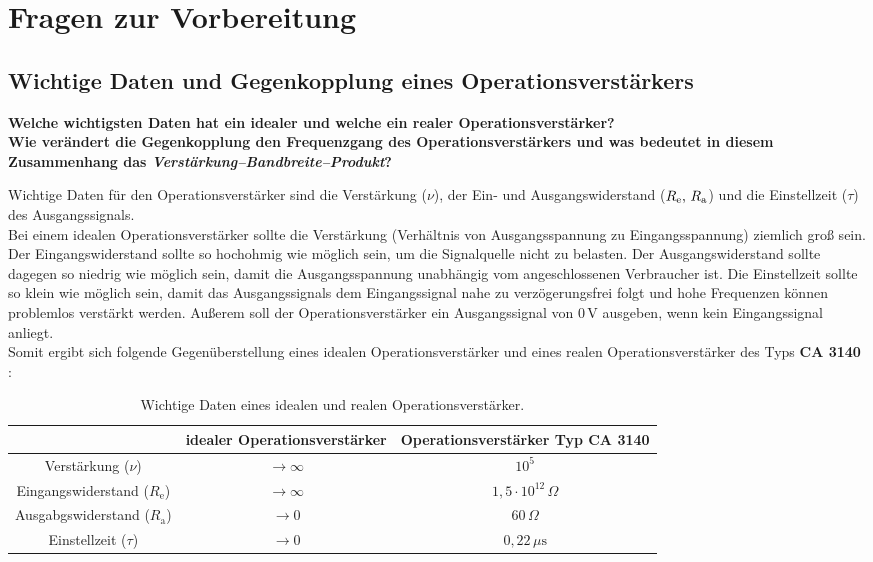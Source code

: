 \chapter{Fragen zur Vorbereitung}
\section{Wichtige Daten und Gegenkopplung eines Operationsverstärkers}
\textbf{Welche wichtigsten Daten hat ein idealer und welche ein realer Operationsverstärker?\\
Wie verändert die Gegenkopplung den Frequenzgang des Operationsverstärkers und
was bedeutet in diesem Zusammenhang das \textit{Verstärkung–Bandbreite–Produkt}?}

Wichtige Daten für den Operationsverstärker sind die Verstärkung ($\nu$), der Ein-\- und Ausgangswiderstand (\(R_\text{e}$, $R_\text{a}\)) und die Einstellzeit ($\tau$) des Ausgangssignals.\\
Bei einem idealen Operationsverstärker sollte die Verstärkung (Verhältnis von Ausgangsspannung zu Eingangsspannung) ziemlich groß sein.
Der Eingangswiderstand sollte so hochohmig wie möglich sein, um die Signalquelle nicht zu belasten.
Der Ausgangswiderstand sollte dagegen so niedrig wie möglich sein, damit die Ausgangsspannung unabhängig vom angeschlossenen Verbraucher ist.
Die Einstellzeit sollte so klein wie möglich sein, damit das Ausgangssignals dem Eingangssignal nahe zu verzögerungsfrei folgt und hohe Frequenzen können problemlos verstärkt werden.
Außerem soll der Operationsverstärker ein Ausgangssignal von $0\,\text{V}$ ausgeben, wenn kein Eingangssignal anliegt.\\
Somit ergibt sich folgende Gegenüberstellung eines idealen Operationsverstärker und eines realen Operationsverstärker des Typs \textbf{CA 3140} \citep[vgl.][S.259]{EKS}:
\begin{table}[h]
    \centering\begin{tabular}{c|c|c}
        &idealer Operationsverstärker & Operationsverstärker Typ CA 3140\\
        \hline
        Verstärkung ($\nu$)&$\to \infty$&$10^5$\\
        Eingangswiderstand ($R_\text{e}$)&$\to \infty$&$1,5\cdot10^{12}\,\Omega$\\
        Ausgabgswiderstand ($R_\text{a}$)&$\to 0$&$60\,\Omega$\\
        Einstellzeit ($\tau$)&$\to 0$&$0,22\,\mu\text{s}$
    \end{tabular}
    \caption{Wichtige Daten eines idealen und realen Operationsverstärker.}
\end{table}\\
